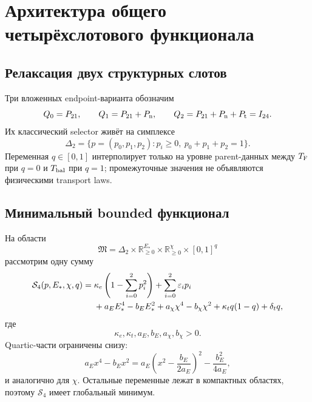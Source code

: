 \chapter{Архитектура общего четырёхслотового функционала}
\label{ch:v9-four-slot-common-functional}

\section{Релаксация двух структурных слотов}

Три вложенных endpoint-варианта обозначим
\begin{equation}
 Q_0=P_{21},\qquad
 Q_1=P_{21}+P_{\rm n},\qquad
 Q_2=P_{21}+P_{\rm n}+P_{\rm t}=I_{24}.
 \label{eq:v9-functional-endpoint-menu}
\end{equation}
Их классический selector живёт на симплексе
\begin{equation}
 \Delta_2=\{p=(p_0,p_1,p_2):p_i\geq0,\ p_0+p_1+p_2=1\}.
 \label{eq:v9-functional-endpoint-simplex}
\end{equation}
Переменная $q\in[0,1]$ интерполирует только на уровне parent-данных между
$T_{\rm F}$ при $q=0$ и $T_{\rm bal}$ при $q=1$; промежуточные значения не
объявляются физическими transport laws.

\section{Минимальный bounded функционал}

На области
\begin{equation}
 \mathfrak M=\Delta_2\times\mathbb R_{\geq0}^{E_*}
 \times\mathbb R_{\geq0}^{\chi}\times[0,1]^q
 \label{eq:v9-functional-domain}
\end{equation}
рассмотрим одну сумму
\begin{align}
 \mathcal S_4(p,E_*,\chi,q)
 ={}&\kappa_e\left(1-\sum_{i=0}^2p_i^2\right)
   +\sum_{i=0}^2\varepsilon_i p_i \notag\\
 &+a_EE_*^4-b_EE_*^2
   +a_\chi\chi^4-b_\chi\chi^2
   +\kappa_tq(1-q)+\delta_tq,
 \label{eq:v9-functional-parent}
\end{align}
где
\begin{equation}
 \kappa_e,\kappa_t,a_E,b_E,a_\chi,b_\chi>0.
 \label{eq:v9-functional-sign-domain}
\end{equation}
Quartic-части ограничены снизу:
\begin{equation}
 a_Ex^4-b_Ex^2
 =a_E\left(x^2-\frac{b_E}{2a_E}\right)^2
 -\frac{b_E^2}{4a_E},
 \label{eq:v9-functional-quartic-completion}
\end{equation}
и аналогично для $\chi$. Остальные переменные лежат в компактных областях,
поэтому $\mathcal S_4$ имеет глобальный минимум.

